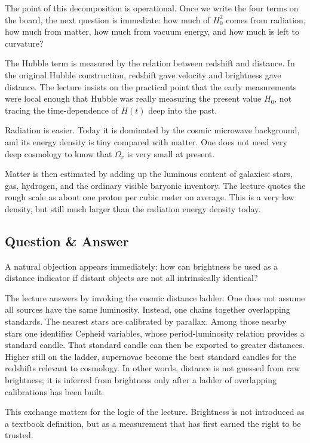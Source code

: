 The point of this decomposition is operational. Once we write the four terms on the board, the next question is immediate: how much of \(H_0^2\) comes from radiation, how much from matter, how much from vacuum energy, and how much is left to curvature?

The Hubble term is measured by the relation between redshift and distance. In the original Hubble construction, redshift gave velocity and brightness gave distance. The lecture insists on the practical point that the early measurements were local enough that Hubble was really measuring the present value \(H_0\), not tracing the time-dependence of \(H(t)\) deep into the past.

Radiation is easier. Today it is dominated by the cosmic microwave background, and its energy density is tiny compared with matter. One does not need very deep cosmology to know that \(\Omega_r\) is very small at present.

Matter is then estimated by adding up the luminous content of galaxies: stars, gas, hydrogen, and the ordinary visible baryonic inventory. The lecture quotes the rough scale as about one proton per cubic meter on average. This is a very low density, but still much larger than the radiation energy density today.

\subsection{Question \& Answer}

A natural objection appears immediately: how can brightness be used as a distance indicator if distant objects are not all intrinsically identical?

The lecture answers by invoking the cosmic distance ladder. One does not assume all sources have the same luminosity. Instead, one chains together overlapping standards. The nearest stars are calibrated by parallax. Among those nearby stars one identifies Cepheid variables, whose period-luminosity relation provides a standard candle. That standard candle can then be exported to greater distances. Higher still on the ladder, supernovae become the best standard candles for the redshifts relevant to cosmology. In other words, distance is not guessed from raw brightness; it is inferred from brightness only after a ladder of overlapping calibrations has been built.

This exchange matters for the logic of the lecture. Brightness is not introduced as a textbook definition, but as a measurement that has first earned the right to be trusted.

